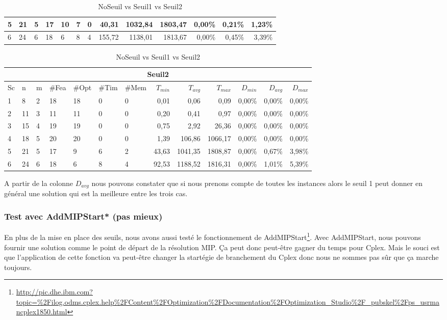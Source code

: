 \documentclass[twoside,fleqn]{EPURapport}
\begin{document}
\begin{table}[h]
\begin{tabular}{|l|l|l|l|l|l|l|r|r|r|r|r|r|}
5&	21&	5&	17&	10&	7&	0&	40,31	&1032,84&	1803,47	&0,00\%	&0,21\%	&1,23\%     \\ \hline
6&	24&	6&	18&	6 &	8&	4&	155,72	&1138,01&	1813,67	&0,00\%	&0,45\%	&3,39\%     \\ \hline
    \end{tabular}
    \label{tab_cut2_s1_tab2}
\vspace{2em}
    \begin{tabular}{|l|l|l|l|l|l|l|r|r|r|r|r|r|}
    	\hline
    	\multicolumn{13}{|c|}{Seuil2}\\ \hline
Sc &	n	&m	&\#Fea	&\#Opt	&\#Tim &\#Mem	&$T_{min}$ & $T_{avg}$	& $T_{max}$ & $D_{min}$ & $D_{avg}$	& $D_{max}$ \\ \hline
1&	8 &	2&	18&	18&	0&	0&	0,01&	0,06&	0,09	&0,00\%&	0,00\%&	0,00\%    \\ \hline
2&	11&	3&	11&	11&	0&	0&	0,20&	0,41&	0,97	&0,00\%&	0,00\%&	0,00\%     \\ \hline
3&	15&	4&	19&	19&	0&	0&	0,75&	2,92&	26,36	&0,00\%&	0,00\%&	0,00\%  \\ \hline
4&	18&	5&	20&	20&	0&	0&	1,39	&106,86	&1066,17	&0,00\%&	0,00\%&	0,00\%     \\ \hline
5&	21&	5&	17&	9 &	6&	2&	43,63	&1041,35&	1808,87	&0,00\%&	0,67\%&	3,98\%     \\ \hline
6&	24&	6&	18&	6 &	8&	4&	92,53	&1188,52&	1816,31	&0,00\%&	1,01\%&	5,39\%     \\ \hline
    \end{tabular}
    \caption{NoSeuil vs Seuil1 vs Seuil2}
    \label{tab_cut2_s2_tab2}
\end{table}
\bigskip
A partir de la colonne $D_{avg}$ nous pouvons constater que si nous prenons compte de toutes les instances alors le seuil 1 peut donner en général une solution qui est la meilleure entre les trois cas.



\subsubsection{Test avec AddMIPStart* (pas mieux)}
En plus de la mise en place des seuils, nous avons aussi testé le fonctionnement de AddMIPStart\footnote{\url{http://pic.dhe.ibm.com?topic=\%2Filog.odms.cplex.help\%2FContent\%2FOptimization\%2FDocumentation\%2FOptimization_Studio\%2F_pubskel\%2Fps_usrmancplex1850.html}}. Avec AddMIPStart, nous pouvons fournir une solution comme le point de départ de la résolution MIP. Ça peut donc peut-être gagner du temps pour Cplex. Mais le souci est que l'application de cette fonction va peut-être changer la startégie de branchement du Cplex donc nous ne sommes pas sûr que ça marche toujours.
\end{document}
